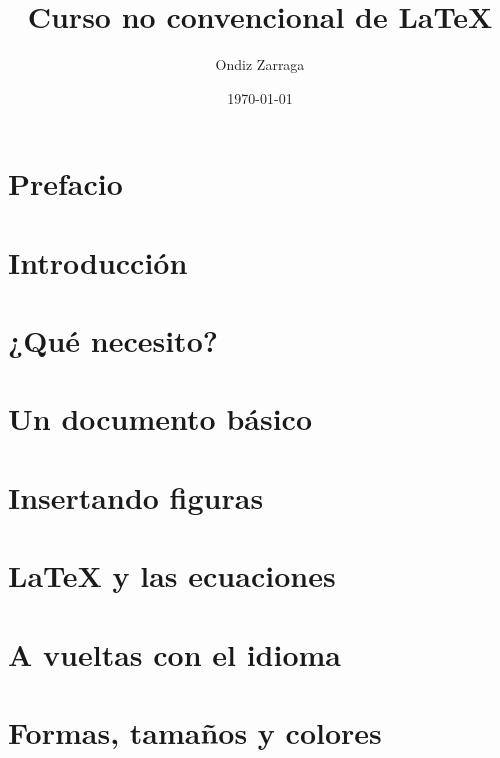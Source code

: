 \documentclass[a4paper,10pt]{book}
\title{Curso no convencional de \LaTeX}
\author{Ondiz Zarraga}
\date{\today}
\begin{document}
\frontmatter
\maketitle
\thispagestyle{empty}

\tableofcontents

\chapter*{Prefacio}


\mainmatter

\chapter{Introducción}


\chapter{¿Qué necesito?}


\chapter{Un documento básico}


\chapter{Insertando figuras}


\chapter{LaTeX y las ecuaciones}


\chapter{A vueltas con el idioma}\label{ch:idioma}


\chapter{Formas, tamaños y colores}

\end{document}
